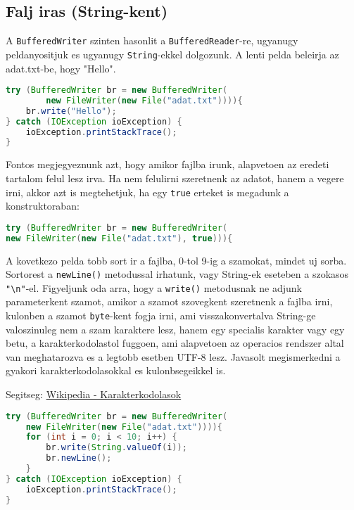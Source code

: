 \documentclass{article}
\let\l\lstinline
\begin{document}
\newpage

\subsection{Falj iras (String-kent)}

A \l{BufferedWriter} szinten hasonlit a \l{BufferedReader}-re, ugyanugy peldanyositjuk es ugyanugy \l{String}-ekkel dolgozunk. A lenti pelda beleirja az adat.txt-be, hogy "Hello".

\begin{lstlisting}[language=Java, caption=Fajlba iras BufferedWriter segitsegevel]
try (BufferedWriter br = new BufferedWriter(
        new FileWriter(new File("adat.txt")))){
    br.write("Hello");
} catch (IOException ioException) {
    ioException.printStackTrace();
}
\end{lstlisting}

Fontos megjegyeznunk azt, hogy amikor fajlba irunk, alapvetoen az eredeti tartalom felul lesz irva. Ha nem felulirni szeretnenk az adatot, hanem a vegere irni, akkor azt is megtehetjuk, ha egy \l{true} erteket is megadunk a  konstruktoraban:

\begin{lstlisting}[language=Java, caption=Fajl vegere iras BufferedWriter segitsegevel]
try (BufferedWriter br = new BufferedWriter(
new FileWriter(new File("adat.txt"), true))){
\end{lstlisting}

A kovetkezo pelda tobb sort ir a fajlba, 0-tol 9-ig a szamokat, mindet uj sorba. Sortorest a \l{newLine()} metodussal irhatunk, vagy String-ek eseteben a szokasos \l{"\n"}-el. Figyeljunk oda arra, hogy a \l{write()} metodusnak ne adjunk parameterkent szamot, amikor a szamot szovegkent szeretnenk a fajlba irni, kulonben a szamot \l{byte}-kent fogja irni, ami visszakonvertalva String-ge valoszinuleg nem a szam karaktere lesz, hanem egy specialis karakter vagy egy betu, a karakterkodolastol fuggoen, ami alapvetoen az operacios rendszer altal van meghatarozva es a legtobb esetben UTF-8 lesz. Javasolt megismerkedni a gyakori karakterkodolasokkal es kulonbsegeikkel is.

Segitseg: \href{https://hu.wikipedia.org/wiki/Kateg\%C3\%B3ria:Karakterk\%C3\%B3dol\%C3\%A1sok}{Wikipedia - Karakterkodolasok}

\begin{lstlisting}[language=Java, caption=Fajlba iras BufferedWriter segitsegevel]
try (BufferedWriter br = new BufferedWriter(
    new FileWriter(new File("adat.txt")))){
    for (int i = 0; i < 10; i++) {
        br.write(String.valueOf(i));
        br.newLine();
    }
} catch (IOException ioException) {
    ioException.printStackTrace();
}
\end{lstlisting}
\end{document}
